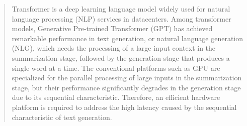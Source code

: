 \documentclass[10pt, conference, compsocconf]{IEEEtran}
\begin{document}




\maketitle


\begin{abstract}








Transformer is a deep learning language model widely used for natural language processing (NLP) services in datacenters. Among transformer models, Generative Pre-trained Transformer (GPT) has achieved remarkable performance in text generation, or natural language generation (NLG), which needs the processing of a large input context in the summarization stage, followed by the generation stage that produces a single word at a time. The conventional platforms such as GPU are specialized for the parallel processing of large inputs in the summarization stage, but their performance significantly degrades in the generation stage due to its sequential characteristic. Therefore, an efficient hardware platform is required to address the high latency caused by the sequential characteristic of text generation.


\end{abstract}
\end{document}
